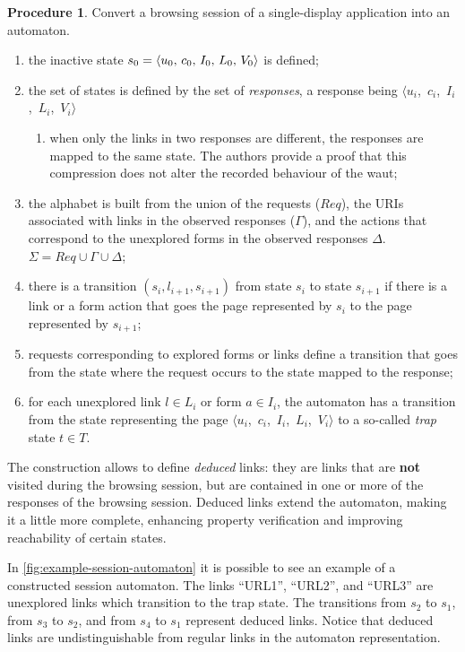 \documentclass[a4paper,10pt]{article}
\newcommand{\res}[1][]{
  \ifthenelse{\equal{#1}{}}{\mbox{$\langle u$, $c$, $I$, $L$, $V\rangle$}}
  {\mbox{$\langle u_{#1}$, $c_{#1}$, $I_{#1}$, $L_{#1}$, $V_{#1}\rangle$}}
}
\theoremstyle{plain} %
\theoremstyle{definition}
\newtheorem{procedure}{Procedure}
\theoremstyle{remark}
\begin{document}
\begin{procedure}
  \label{browsing-session-to-automaton}
  Convert a browsing session of a single-display application into an automaton.

  \begin{enumerate}
    \item the inactive state $s_0 = \res[0]$ is defined;
    \item the set of states is defined by the set of \emph{responses}, a response being \res[i]
      \begin{enumerate}
        \item when only the links in two responses are different, the responses are mapped to the same state. The authors provide a proof that this compression does not alter the recorded behaviour of the \gls{waut};
      \end{enumerate}
    \item the alphabet is built from the union of the requests ($Req$), the URIs associated with links in the observed responses ($\Gamma$), and the actions that correspond to the unexplored forms in the observed responses $\Delta$. $\Sigma=Req\cup\Gamma\cup\Delta$;
    \item there is a transition $(s_i,l_{i+1},s_{i+1})$ from state $s_i$ to state $s_{i+1}$ if there is a link or a form action that goes the page represented by $s_i$ to the page represented by $s_{i+1}$;
    \item requests corresponding to explored forms or links define a transition that goes from the state where the request occurs to the state mapped to the response;
    \item for each unexplored link $l \in L_i$ or form $a \in I_i$, the automaton has a transition from the state representing the page \res[i] to a so-called \textit{trap} state $t \in T$.
  \end{enumerate}
\end{procedure}

The construction allows to define \emph{deduced} links: they are links that are \textbf{not} visited during the browsing session, but are contained in one or more of the responses of the browsing session. Deduced links extend the automaton, making it a little more complete, enhancing property verification and improving reachability of certain states.

In \cref{fig:example-session-automaton} it is possible to see an example of a constructed session automaton. The links ``URL1'', ``URL2'', and ``URL3'' are unexplored links which transition to the trap state. The transitions from $s_2$ to $s_1$, from $s_3$ to $s_2$, and from $s_4$ to $s_1$ represent deduced links. Notice that deduced links are undistinguishable from regular links in the automaton representation.
\end{document}
